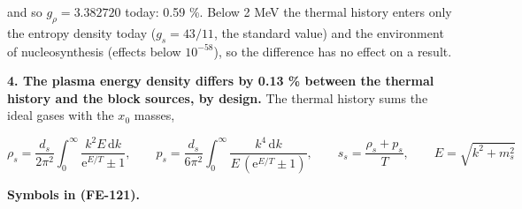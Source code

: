 \documentclass[
  10pt,
]{article}
\begin{document}
and so \(g_\rho = 3.382720\) today: 0.59 \%. Below 2 MeV the thermal
history enters only the entropy density today (\(g_s = 43/11\), the
standard value) and the environment of nucleosynthesis (effects below
\(10^{-58}\)), so the difference has no effect on a result.

\textbf{4. The plasma energy density differs by 0.13 \% between the
thermal history and the block sources, by design.} The thermal history
sums the ideal gases with the \(x_0\) masses,

\[
\rho_s = \frac{d_s}{2\pi^2}\int_0^\infty\frac{k^2E\,\mathrm{d}k}{\mathrm{e}^{E/T} \pm 1},\qquad
p_s = \frac{d_s}{6\pi^2}\int_0^\infty\frac{k^4\,\mathrm{d}k}{E\,(\mathrm{e}^{E/T} \pm 1)},\qquad
s_s = \frac{\rho_s + p_s}{T},\qquad E = \sqrt{k^2 + m_s^2} \tag{FE-121}
\]

\textbf{Symbols in (FE-121).}
\end{document}
